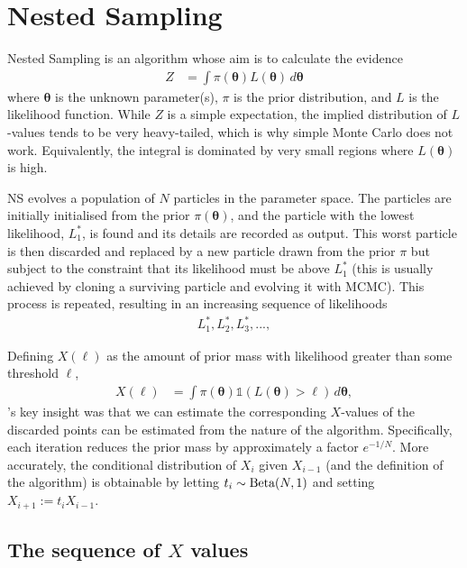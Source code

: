 \documentclass[entropy,article,accept,oneauthor,pdftex,10pt,a4paper]{mdpi}
\newcommand{\x}{\boldsymbol{\theta}}
\begin{document}
\section{Nested Sampling}

Nested Sampling \citep[NS][]{skilling2006nested} is an algorithm whose aim is
to calculate the evidence
\begin{align}
Z &= \int \pi(\x) L(\x) \, d\x
\end{align}
where $\x$ is the unknown parameter(s), $\pi$ is the prior distribution,
and $L$ is the likelihood function. While $Z$ is a simple expectation, the
implied distribution of $L$-values tends to be very heavy-tailed, which is
why simple Monte Carlo does not work. Equivalently, the integral is dominated
by very small regions where $L(\x)$ is high.

NS evolves a population of
$N$ particles in the parameter space.
The particles are initially initialised from the prior $\pi(\x)$, and the
particle with the lowest likelihood, $L^*_1$, is found and its details are
recorded as output. This worst particle is then discarded
and replaced by a new particle
drawn from the prior $\pi$ but subject to the constraint that its likelihood
must be above $L^*_1$ (this is usually achieved by cloning a surviving particle
and evolving it with MCMC). This process is repeated, resulting in an
increasing sequence of likelihoods
\begin{align}
L^*_1, L^*_2, L^*_3,..., 
\end{align}

Defining $X(\ell)$ as the amount of prior mass with likelihood greater than
some threshold $\ell$,
\begin{align}
X(\ell) &= \int \pi(\x) \mathds{1}\left(L(\x) > \ell\right) \, d\x,
\end{align}
\citet{skilling2006nested}'s key insight was that we can estimate the corresponding
$X$-values of the discarded points can be estimated from the nature of the
algorithm. Specifically, each iteration reduces the prior mass by approximately
a factor $e^{-1/N}$. More accurately, the conditional distribution of
$X_{i}$ given $X_{i-1}$ (and the definition of the algorithm)
is obtainable by letting
$t_i \sim \textnormal{Beta}(N,1)$ and setting $X_{i+1} := t_iX_{i-1}$.

\subsection{The sequence of $X$ values}
\end{document}
